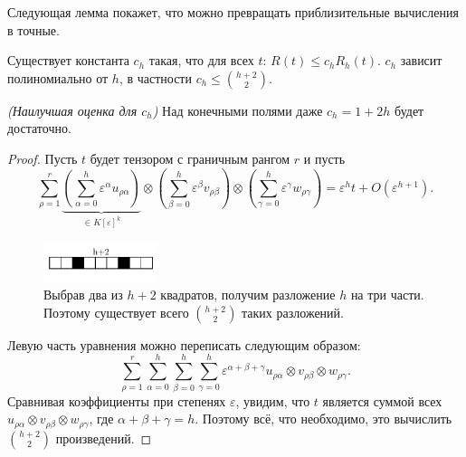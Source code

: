 Следующая лемма покажет, что можно превращать приблизительные вычисления в точные.
\begin{lemma}\label{lem:bi:5.4}
  Существует константа $c_h$ такая, что для всех $t$: $R(t) \leq c_h R_h(t)$. $c_h$ зависит полиномиально от $h$, в частности $c_h \leq \binom{h+2}{2}$.
\end{lemma}
\begin{remark}
  \textit{(Наилучшая оценка для $c_h$)} Над конечными полями даже $c_h=1 + 2h$ будет достаточно.
\end{remark}
\begin{proof}
  Пусть $t$ будет тензором с граничным рангом $r$ и пусть
  \[
  	\sum_{\rho=1}^r \underbrace{\left( \sum_{\alpha=0}^h \varepsilon^\alpha u_{\rho \alpha} \right)}_{\in K[\varepsilon]^k} \otimes \left( \sum_{\beta=0}^h \varepsilon^\beta v_{\rho \beta} \right) \otimes \left( \sum_{\gamma=0}^h \varepsilon^\gamma w_{\rho \gamma} \right) = \varepsilon^h t + O(\varepsilon^{h+1}).
  \]
  \begin{figure}[H]
	\centering
    \includegraphics[width=0.3\textwidth]{figures/decomposition}
	\caption{Выбрав два из $h+2$ квадратов, получим разложение $h$ на три части. Поэтому существует всего $\binom{h+2}{2}$ таких разложений.}
	\label{fig:bi:5.1}
  \end{figure}
  Левую часть уравнения можно переписать следующим образом:
  \[
  	\sum_{\rho=1}^r \sum_{\alpha=0}^h \sum_{\beta=0}^h \sum_{\gamma=0}^h \varepsilon^{\alpha+\beta+\gamma} u_{\rho \alpha} \otimes v_{\rho \beta} \otimes w_{\rho \gamma}.
  \]
  Сравнивая коэффициенты при степенях $\varepsilon$, увидим, что $t$ является суммой всех $u_{\rho \alpha} \otimes v_{\rho \beta} \otimes w_{\rho \gamma}$, где $\alpha + \beta + \gamma = h$. Поэтому всё, что необходимо, это вычислить $\binom{h+2}{2}$ произведений.
\end{proof}

